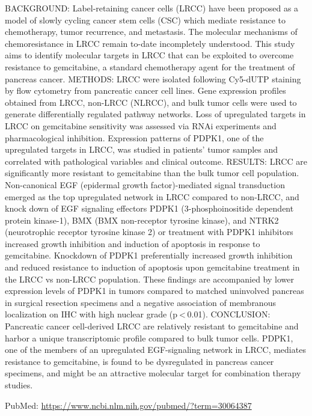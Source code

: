 \documentclass[]{article}
\begin{document}
BACKGROUND: Label-retaining cancer cells (LRCC) have been proposed as a
model of slowly cycling cancer stem cells (CSC) which mediate resistance
to chemotherapy, tumor recurrence, and metastasis. The molecular
mechanisms of chemoresistance in LRCC remain to-date incompletely
understood. This study aims to identify molecular targets in LRCC that
can be exploited to overcome resistance to gemcitabine, a standard
chemotherapy agent for the treatment of pancreas cancer. METHODS: LRCC
were isolated following Cy5-dUTP staining by flow cytometry from
pancreatic cancer cell lines. Gene expression profiles obtained from
LRCC, non-LRCC (NLRCC), and bulk tumor cells were used to generate
differentially regulated pathway networks. Loss of upregulated targets
in LRCC on gemcitabine sensitivity was assessed via RNAi experiments and
pharmacological inhibition. Expression patterns of PDPK1, one of the
upregulated targets in LRCC, was studied in patients' tumor samples and
correlated with pathological variables and clinical outcome. RESULTS:
LRCC are significantly more resistant to gemcitabine than the bulk tumor
cell population. Non-canonical EGF (epidermal growth factor)-mediated
signal transduction emerged as the top upregulated network in LRCC
compared to non-LRCC, and knock down of EGF signaling effectors PDPK1
(3-phosphoinositide dependent protein kinase-1), BMX (BMX non-receptor
tyrosine kinase), and NTRK2 (neurotrophic receptor tyrosine kinase 2) or
treatment with PDPK1 inhibitors increased growth inhibition and
induction of apoptosis in response to gemcitabine. Knockdown of PDPK1
preferentially increased growth inhibition and reduced resistance to
induction of apoptosis upon gemcitabine treatment in the LRCC vs
non-LRCC population. These findings are accompanied by lower expression
levels of PDPK1 in tumors compared to matched uninvolved pancreas in
surgical resection specimens and a negative association of membranous
localization on IHC with high nuclear grade (p \textless{} 0.01).
CONCLUSION: Pancreatic cancer cell-derived LRCC are relatively resistant
to gemcitabine and harbor a unique transcriptomic profile compared to
bulk tumor cells. PDPK1, one of the members of an upregulated
EGF-signaling network in LRCC, mediates resistance to gemcitabine, is
found to be dysregulated in pancreas cancer specimens, and might be an
attractive molecular target for combination therapy studies.

PubMed: \url{https://www.ncbi.nlm.nih.gov/pubmed/?term=30064387}

{}
\end{document}
